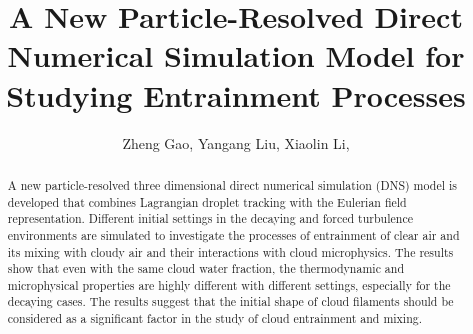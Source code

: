 \documentclass[draft,jgrga]{AGUTeX}
\begin{document}
\title{A New Particle-Resolved Direct Numerical Simulation Model for Studying Entrainment Processes}
\author{Zheng Gao,
Yangang Liu,
Xiaolin Li,}


\begin{abstract}
A new particle-resolved three dimensional direct numerical simulation (DNS) model is developed that combines Lagrangian droplet tracking with the Eulerian field representation. Different initial settings in the decaying and forced turbulence environments are simulated to investigate the processes of entrainment of clear air and its mixing with cloudy air and their interactions with cloud microphysics.
The results show that even with the same cloud water fraction, the thermodynamic and microphysical properties are highly different with different settings, especially for the decaying cases. The results suggest that the initial shape of cloud filaments should be considered as a significant factor in the study of cloud entrainment and mixing.   
\end{abstract}
\end{document}
